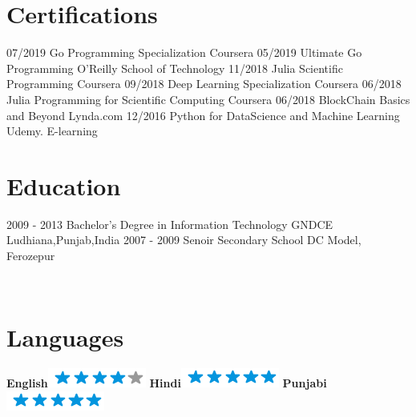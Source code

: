 \documentclass[]{friggeri-cv}
\begin{document}
\section{Certifications}
\begin{entrylist}
  \entry
    {07/2019}
    {Go Programming Specialization}
    {Coursera}
    {\emph{}}
  \entry
    {05/2019}
    {Ultimate Go Programming}
    {O'Reilly School of Technology}
    {\emph{}}
  \entry
    {11/2018}
    {Julia Scientific Programming}
    {Coursera}
    {\emph{}}
  \entry
    {09/2018}
    {Deep Learning Specialization}
    {Coursera}
    {\emph{}}
  \entry
    {06/2018}
    {Julia Programming for Scientific Computing}
    {Coursera}
    {\emph{}}
  \entry
    {06/2018}
    {BlockChain Basics and Beyond}
    {Lynda.com}
    {\emph{}}
  \entry
    {12/2016}
    {Python for DataScience and Machine Learning}
    {Udemy. E-learning}
    {\emph{}}
\end{entrylist}

\section{Education}
\begin{entrylist}
  \entry
    {2009 - 2013}
    {Bachelor's Degree in Information Technology}
    {GNDCE Ludhiana,Punjab,India}
    {\emph{}}
  \entry
    {2007 - 2009}
    {Senoir Secondary School}
    {DC Model, Ferozepur}
    {\emph{}}
\end{entrylist}
\begin{aside}
~
~
~
   \section{Languages}
    \textbf{English}\includegraphics[scale=0.40]{img/4stars.png}
    \textbf{Hindi}\includegraphics[scale=0.40]{img/5stars.png}
    \textbf{Punjabi}\includegraphics[scale=0.40]{img/5stars.png}
\end{aside}
\end{document}
